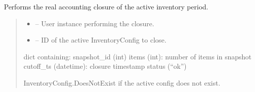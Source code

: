 \documentclass[a4paper,11pt,spanish]{sphinxmanual}
\begin{document}
\begin{fulllineitems}
\label{\detokenize{api/inventory/inventory.services:inventory.services.cerrar_periodo_snapshot}}
\pysigstartsignatures
\pysiglinewithargsret
{}
{\sphinxparamcomma {}}
{}
\pysigstopsignatures
\sphinxAtStartPar
Performs the real accounting closure of the active inventory period.
\begin{quote}\begin{description}
\begin{itemize}
\item {} 
\sphinxAtStartPar
{} – User instance performing the closure.

\item {} 
\sphinxAtStartPar
{} – ID of the active InventoryConfig to close.

\end{itemize}

\sphinxAtStartPar
dict containing:
\sphinxhyphen{} snapshot\_id (int)
\sphinxhyphen{} items (int): number of items in snapshot
\sphinxhyphen{} cutoff\_ts (datetime): closure timestamp
\sphinxhyphen{} status (“ok”)

\sphinxAtStartPar
InventoryConfig.DoesNotExist if the active config does not exist.

\end{description}\end{quote}

\end{fulllineitems}

\end{document}
